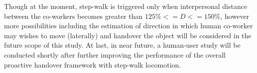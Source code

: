 Though at the moment, step-walk is triggered only when interpersonal distance between the co-workers becomes greater than $ 125\% <= D <= 150\% $, however more possibilities including the estimation of direction in which human co-worker may wishes to move (laterally) and handover the object will be considered in the future scope of this study. At last, in near future, a human-user study will be conducted shortly after further improving the performance of the overall proactive handover framework with step-walk locomotion.


\clearpage %
\pagestyle{fancy}









